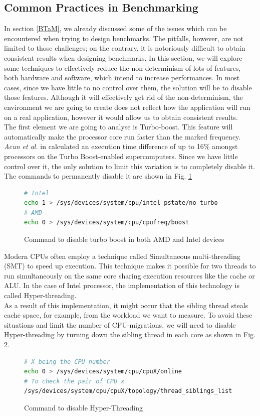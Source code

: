 \subsection{Common Practices in Benchmarking}\label{sec:ben_challenges} \label{sec:remove_inter}
In section \ref{BTaM}, we already discussed some of the issues which can be encountered when trying to design benchmarks. The pitfalls, however, are not limited to those challenges; on the contrary, it is notoriously difficult to obtain consistent results when designing benchmarks. In this section, we will explore some techniques to effectively reduce the non-determinism of lots of features, both hardware and software, which intend to increase performances. In most cases, since we have little to no control over them, the solution will be to disable those features. Although it will effectively get rid of the non-determinism, the environment we are going to create does not reflect how the application will run on a real application, however it would allow us to obtain consistent results. \\
The first element we are going to analyse is Turbo-boost. This feature will automatically make the processor core run faster than the marked frequency. \textit{Acun et al.} in \cite{turbo_boost} calculated an execution time difference of up to 16\% amongst processors on the Turbo Boost-enabled supercomputers. Since we have little control over it, the only solution to limit this variation is to completely disable it. The commands to permanently disable it are shown in Fig. \ref{fig:no_boos}
\begin{figure}[h]
\begin{lstlisting}[language=bash]
# Intel
echo 1 > /sys/devices/system/cpu/intel_pstate/no_turbo
# AMD
echo 0 > /sys/devices/system/cpu/cpufreq/boost
\end{lstlisting}
\caption{Command to disable turbo boost in both AMD and Intel devices}
\label{fig:no_boos}
\end{figure}

Modern CPUs often employ a technique called Simultaneous multi-threading (SMT) to speed up execution. This technique makes it possible for two threads to run simultaneously on the same core sharing execution resources like the cache or ALU. In the case of Intel processor, the implementation of this technology is called Hyper-threading.\\
As a result of this implementation, it might occur that the sibling thread steals cache space, for example, from the workload we want to measure. To avoid these situations and limit the number of CPU-migrations, we will need to disable Hyper-threading by turning down the sibling thread in each core as shown in Fig. \ref{fig:no_ht}. 
\begin{figure}[h]
\begin{lstlisting}[language=bash]
# X being the CPU number
echo 0 > /sys/devices/system/cpu/cpuX/online
# To check the pair of CPU x
/sys/devices/system/cpu/cpuX/topology/thread_siblings_list
\end{lstlisting}
\caption{Command to disable Hyper-Threading}
\label{fig:no_ht}
\end{figure}


